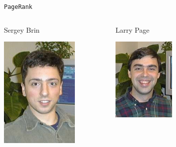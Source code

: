\documentclass[xcolor=table,final]{beamer} %
\newcommand{\PageRank}{\texttt{PageRank}\xspace}
\begin{document}
\begin{frame}{\PageRank}%
  \begin{columns}
\begin{center}
    Sergey Brin

    \includegraphics[width=0.7\textwidth]{figs/extras/sergey-brin}
\end{center}
    
\begin{center}
    Larry Page

    \includegraphics[width=0.7\textwidth]{figs/extras/larry-page}


\end{center}
\end{columns}
\end{frame}
\end{document}
